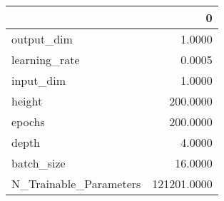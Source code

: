 \begin{tabular}{lr}
\toprule
{} &            0 \\
\midrule
output\_dim             &       1.0000 \\
learning\_rate          &       0.0005 \\
input\_dim              &       1.0000 \\
height                 &     200.0000 \\
epochs                 &     200.0000 \\
depth                  &       4.0000 \\
batch\_size             &      16.0000 \\
N\_Trainable\_Parameters &  121201.0000 \\
\bottomrule
\end{tabular}
